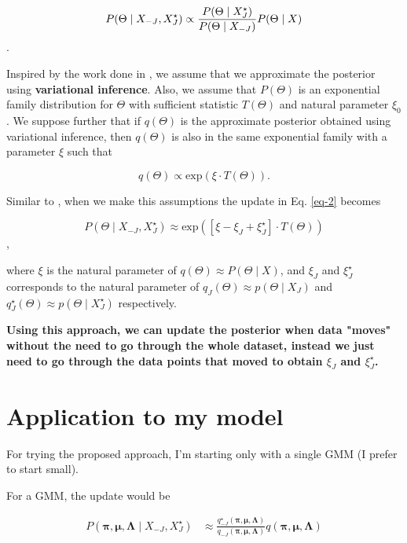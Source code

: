 \documentclass{article}
\begin{document}
\begin{equation}
\label{eq-2}
P(\Theta \mid X_{-J}, X_{J}^{\star}) \propto 
\frac{P(\Theta \mid X_{J}^{\star})}{P(\Theta \mid X_{-J})}P(\Theta \mid X) \\
\end{equation}.

Inspired by the work done in \cite{streaming-variational-bayes}, we assume 
that we approximate the posterior using \textbf{variational inference}. Also,
we assume that $P(\Theta)$ is an exponential family distribution for $\Theta$
with sufficient statistic $T(\Theta)$ and natural parameter $\xi_0$. We suppose
further that if $q(\Theta)$ is the approximate posterior obtained using
variational inference, then $q(\Theta)$ is also in the same exponential family
with a parameter $\xi$ such that

\begin{equation}
\label{exponential-family}
q(\Theta) \propto \text{exp}(\xi \cdot T(\Theta)).
\end{equation}

Similar to \cite{streaming-variational-bayes}, when we make this assumptions
the update in Eq. \ref{eq-2} becomes

\begin{equation}
P(\Theta \mid X_{-J}, X_{J}^{\star}) \approx 
\text{exp}([\xi - \xi_{J} + \xi_{J}^{\star}] \cdot T(\Theta))
\end{equation},

where $\xi$ is the natural parameter of $q(\Theta) \approx P(\Theta \mid X)$,
and $\xi_{J}$ and $\xi_{J}^{\star}$ corresponds to the natural parameter of 
$q_{J}(\Theta) \approx p(\Theta \mid X_{J})$ and 
$q_{J}^{\star}(\Theta) \approx p(\Theta \mid X_{J}^{\star})$ respectively.

\textbf{Using this approach, we can update the posterior when data "moves" 
without the need to go through the whole dataset, instead we just need to go 
through the data points that moved to obtain $\xi_{J}$ and $\xi_{J}^{\star}$.}

\section{Application to my model}
For trying the proposed approach, I'm starting only with a single GMM (I prefer
to start small).

For a GMM, the update would be

\begin{align}
P(\boldsymbol{\pi}, \boldsymbol{\mu}, \boldsymbol{\Lambda} 
    \mid X_{-J}, X_J^{\star}) 
&\approx \frac{q_{-J}^{\star}(\boldsymbol{\pi}, \boldsymbol{\mu}, 
    \boldsymbol{\Lambda})}
    {q_{-J}(\boldsymbol{\pi}, \boldsymbol{\mu}, \boldsymbol{\Lambda})}
    q(\boldsymbol{\pi}, \boldsymbol{\mu}, \boldsymbol{\Lambda}) \\
\end{align}
\end{document}
